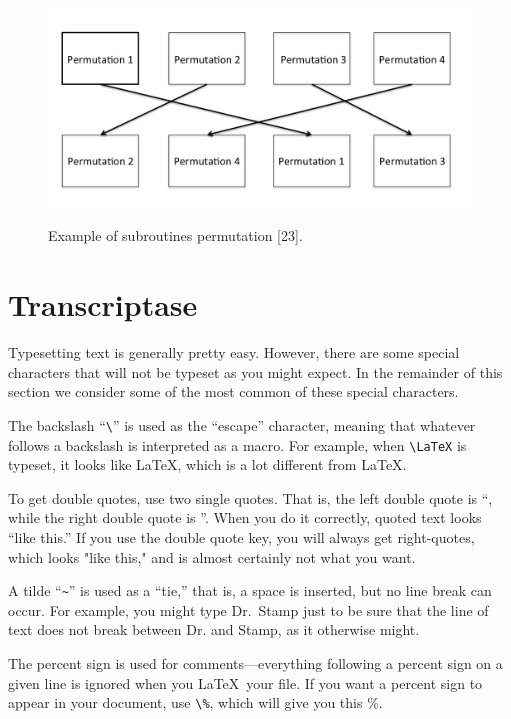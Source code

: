 \begin{figure}
  \centering
      \includegraphics[width=12cm, height=6cm]{subpermutation.jpg}
    \caption[Example of subroutines permutation]{Example of subroutines permutation [23].}
    \label{fig:subpermutation}
\end{figure}

\section{Transcriptase}

Typesetting text is generally pretty easy. However, there are some special
characters that will not be typeset as you might expect. In the remainder of this
section we consider some of the most common of these
special characters. 

The backslash ``\verb+\+'' is used 
as the ``escape'' character, meaning that
whatever follows a backslash is interpreted as a macro.
For example, when \verb+\LaTeX+ is typeset, it looks like \LaTeX, which 
is a lot different from LaTeX.

To get double quotes, use two single quotes. That is, the left double quote is ``, while the right double
quote is ''. When you do it correctly, quoted text looks ``like this.''
If you use the double quote key, you will always get right-quotes, which looks "like this," and is
almost certainly not what you want.

A tilde ``\verb+~+'' is used as a ``tie,'' that is, a space is inserted, but no line break can occur.
For example, you might type Dr.~Stamp just to be sure that the line of text
does not break between Dr. and Stamp, as it otherwise might.

The percent sign is used for comments---everything following a percent sign 
on a given line is ignored when you \LaTeX\ your file. %
If you want a percent sign to appear in your document, use \verb+\%+, 
which will give you this \%.


